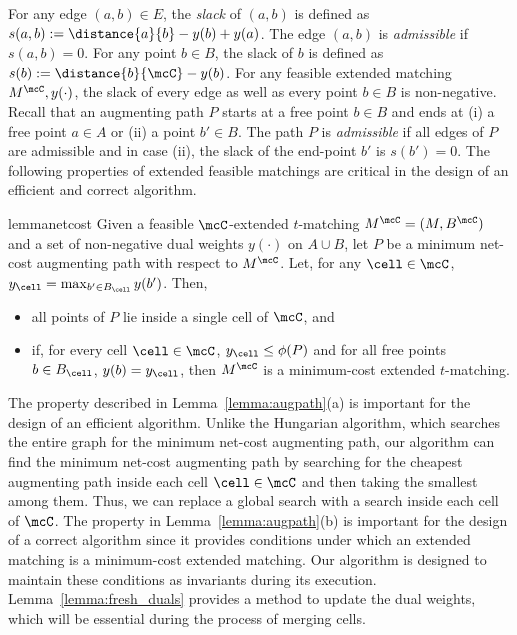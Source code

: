 For any  edge $(a,b)\in E$, the \emph{slack} of $(a,b)$ is defined as $s(a,b):=\distance{a}{b} - y(b) + y(a)$. The edge $(a,b)$ is \emph{admissible} if $s(a,b)=0$. For any point $b\in B$, the slack of $b$ is defined as $s(b):=\distance{b}{\mcC} - y(b)$. For any feasible extended matching $M^{\mcC}, y(\cdot)$, the slack of every edge as well as every point $b \in B$ is non-negative.
Recall that an augmenting path $P$ starts at a free point $b\in B$ and ends at (i) a free point $a\in A$ or (ii) a point $b'\in B$. The path $P$ is \emph{admissible} if all edges of $P$ are admissible and in case (ii), the slack of the end-point $b'$ is $s(b')=0$.
The following properties of extended feasible matchings are critical in the design of an efficient and correct algorithm.


\begin{restatable}{lemma}{netcost}\label{lemma:augpath}
Given a feasible $\mcC$-extended $t$-matching $M^{\mcC} = (M, B^{\mcC})$ and a set of non-negative dual weights $y(\cdot)$ on $A\cup B$, let $P$ be a minimum net-cost augmenting path with respect to $M^{\mcC}$. Let, for any $\cell \in \mcC$, $y_\cell=\max_{b' \in B_{\cell}} y(b')$.
Then, 
\begin{itemize}
\item[(a)] all points of $P$ lie inside a single cell of $\mcC$, and
\item[(b)] if, for every cell $\cell \in \mcC$, $y_\cell \le \phi(P)$ and for all free points $b\in B_\cell$, $y(b) = y_\cell$, then $M^\mcC$ is a minimum-cost extended $t$-matching.
\end{itemize}
\end{restatable}

\vspace{1em}
The property described in Lemma~\ref{lemma:augpath}(a) is important for the design of an efficient algorithm. Unlike the Hungarian algorithm, which searches the entire graph for the minimum net-cost augmenting path, our algorithm can find the minimum net-cost augmenting path by searching for the cheapest augmenting path inside each cell $\cell \in\mcC$ and then taking the smallest among them. Thus, we can replace a global search with a search inside each cell of $\mcC$.
The property in Lemma~\ref{lemma:augpath}(b) is important for the design of a correct algorithm since it provides conditions under which an extended matching is a minimum-cost extended matching. Our algorithm is designed to maintain these conditions as invariants during its execution.  
Lemma~\ref{lemma:fresh_duals} provides a method to update the dual weights, which will be essential during the process of merging cells.


